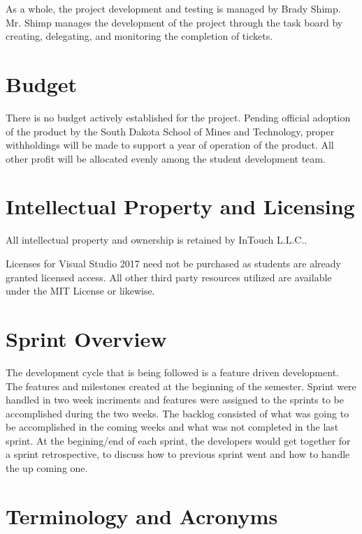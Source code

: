 As a whole, the project development and testing is managed by Brady Shimp. Mr. Shimp manages the development of the project through the task board by creating, delegating, and monitoring the completion of tickets. 

\section{Budget}

There is no budget actively established for the project. Pending official adoption of the product by the South Dakota School of Mines and Technology, proper withholdings will be made to support a year of operation of the product. All other profit will be allocated evenly among the student development team. 

\section{Intellectual Property and Licensing}

All intellectual property and ownership is retained by InTouch L.L.C.. 

Licenses for Visual Studio 2017 need not be purchased as students are already granted licensed access. All other third party resources utilized are available under the MIT License or likewise. 


\section{Sprint  Overview}
The development cycle that is being followed is a feature driven development.
The features and milestones created at the beginning of the semester.
Sprint were handled in two week incriments and features were assigned to 
the sprints to be accomplished during the two weeks. The backlog consisted
of what was going to be accomplished in the coming weeks and what was not
completed in the last sprint. At the begining/end of each sprint, the 
developers would get together for a sprint retrospective, to discuss
how to previous sprint went and how to handle the up coming one.


\section{Terminology and Acronyms}

